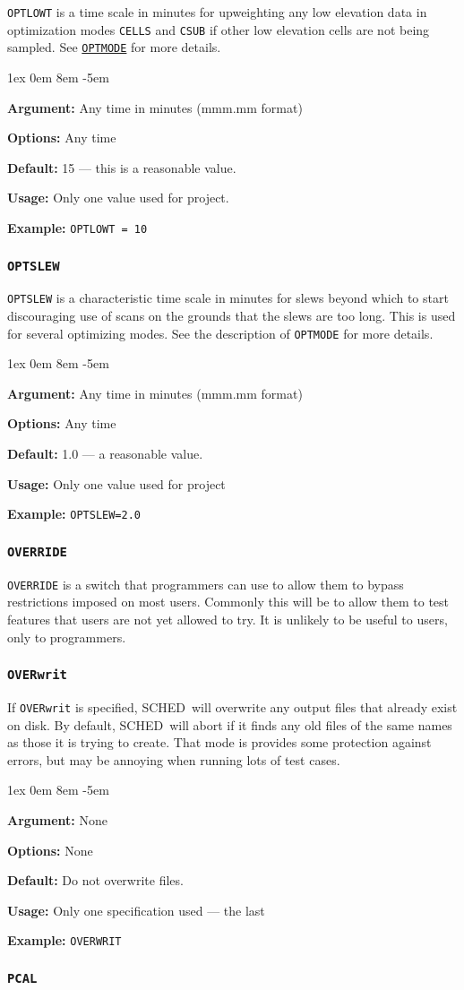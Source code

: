 \documentclass{report}
\newcommand{\schedb}{{\sc SCHED~}}
\newcommand{\rcwbox}[5]{
  \begin{list}{}{\parsep 1ex  \itemsep 0em
                 \leftmargin 8em  \itemindent -5em }
    \item {\bf Argument:} #1
    \item {\bf Options:}  #2
    \item {\bf Default:}  #3
    \item {\bf Usage:}    #4
    \item {\bf Example:}  #5
  \end{list}
}
\begin{document}
{\tt OPTLOWT} is a time scale in minutes for upweighting any low
elevation data in optimization modes {\tt CELLS} and {\tt CSUB} if
other low elevation cells are not being sampled.  See 
{\hyperref[MP:OPTMODE]{{\tt OPTMODE}}} for more details.

\rcwbox
{Any time in minutes (mmm.mm format) }
{Any time}
{15 --- this is a reasonable value.}
{Only one value used for project.}
{{\tt OPTLOWT = 10}}

\subsubsection{\label{MP:OPTSLEW}{\tt OPTSLEW}}

{\tt OPTSLEW} is a characteristic time scale in minutes for slews
beyond which to start discouraging use of scans on the grounds that
the slews are too long.  This is used for several optimizing modes.
See the description of {\tt OPTMODE} for more details.

\rcwbox
{Any time in minutes (mmm.mm format)}
{Any time}
{1.0 --- a reasonable value.}
{Only one value used for project}
{{\tt OPTSLEW=2.0}}


\subsubsection{\label{MP:OVERRIDE}{\tt OVERRIDE}}

{\tt OVERRIDE} is a switch that programmers can use to allow them to
bypass restrictions imposed on most users.  Commonly this will be to
allow them to test features that users are not yet allowed to try. It is
unlikely to be useful to users, only to programmers.


\subsubsection{\label{MP:OVERWRIT}{\tt OVERwrit}}

If {\tt OVERwrit} is specified, \schedb will overwrite any output
files that already exist on disk.  By default, \schedb will abort
if it finds any old files of the same names as those it is trying to
create.  That mode is provides some protection against errors, but
may be annoying when running lots of test cases.

\rcwbox
{None}
{None}
{Do not overwrite files.}
{Only one specification used --- the last}
{{\tt OVERWRIT}}


\subsubsection{\label{MP:PCAL}{\tt PCAL}}
\end{document}
